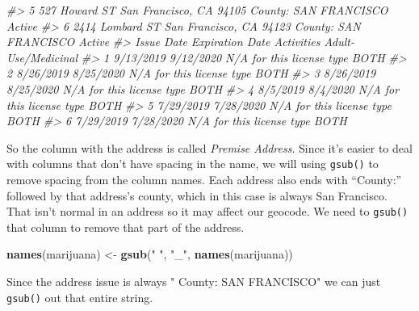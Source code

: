 \documentclass[
  12pt,
]{book}
\newenvironment{Shaded}{\begin{snugshade}}{\end{snugshade}}
\newcommand{\CommentTok}[1]{\textcolor[rgb]{0.56,0.35,0.01}{\textit{#1}}}
\newcommand{\KeywordTok}[1]{\textcolor[rgb]{0.13,0.29,0.53}{\textbf{#1}}}
\newcommand{\NormalTok}[1]{#1}
\newcommand{\OperatorTok}[1]{\textcolor[rgb]{0.81,0.36,0.00}{\textbf{#1}}}
\newcommand{\StringTok}[1]{\textcolor[rgb]{0.31,0.60,0.02}{#1}}
\begin{document}
\begin{Shaded}
\begin{Highlighting}[]
\CommentTok{\#> 5   527 Howard ST San Francisco, CA 94105 County: SAN FRANCISCO Active}
\CommentTok{\#> 6 2414 Lombard ST San Francisco, CA 94123 County: SAN FRANCISCO Active}
\CommentTok{\#>   Issue Date Expiration Date                Activities Adult{-}Use/Medicinal}
\CommentTok{\#> 1  9/13/2019       9/12/2020 N/A for this license type                BOTH}
\CommentTok{\#> 2  8/26/2019       8/25/2020 N/A for this license type                BOTH}
\CommentTok{\#> 3  8/26/2019       8/25/2020 N/A for this license type                BOTH}
\CommentTok{\#> 4   8/5/2019        8/4/2020 N/A for this license type                BOTH}
\CommentTok{\#> 5  7/29/2019       7/28/2020 N/A for this license type                BOTH}
\CommentTok{\#> 6  7/29/2019       7/28/2020 N/A for this license type                BOTH}
\end{Highlighting}
\end{Shaded}

So the column with the address is called \emph{Premise Address}. Since it's easier to deal with columns that don't have spacing in the name, we will using \texttt{gsub()} to remove spacing from the column names. Each address also ends with ``County:'' followed by that address's county, which in this case is always San Francisco. That isn't normal in an address so it may affect our geocode. We need to \texttt{gsub()} that column to remove that part of the address.

\begin{Shaded}
\begin{Highlighting}[]
\KeywordTok{names}\NormalTok{(marijuana) <{-}}\StringTok{ }\KeywordTok{gsub}\NormalTok{(}\StringTok{" "}\NormalTok{, }\StringTok{"\_"}\NormalTok{, }\KeywordTok{names}\NormalTok{(marijuana))}
\end{Highlighting}
\end{Shaded}

Since the address issue is always " County: SAN FRANCISCO" we can just \texttt{gsub()} out that entire string.

\begin{Shaded}
\end{Shaded}
\end{document}
